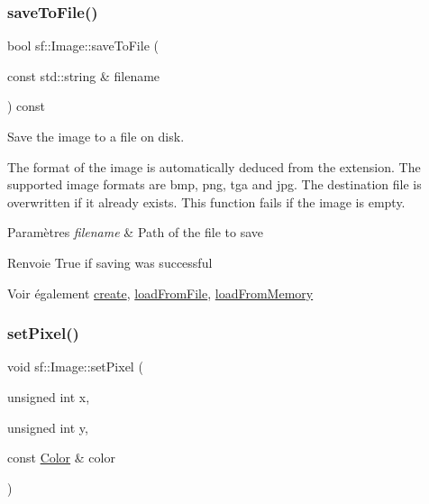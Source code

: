 \subsubsection{\texorpdfstring{save\+To\+File()}{saveToFile()}}
{\footnotesize\ttfamily bool sf\+::\+Image\+::save\+To\+File (\begin{DoxyParamCaption}\item[{const std\+::string \&}]{filename }\end{DoxyParamCaption}) const}



Save the image to a file on disk. 

The format of the image is automatically deduced from the extension. The supported image formats are bmp, png, tga and jpg. The destination file is overwritten if it already exists. This function fails if the image is empty.


\begin{DoxyParams}{Paramètres}
{\em filename} & Path of the file to save\\
\hline
\end{DoxyParams}
\begin{DoxyReturn}{Renvoie}
True if saving was successful
\end{DoxyReturn}
\begin{DoxySeeAlso}{Voir également}
\hyperlink{classsf_1_1Image_a2a67930e2fd9ad97cf004e918cf5832b}{create}, \hyperlink{classsf_1_1Image_a9e4f2aa8e36d0cabde5ed5a4ef80290b}{load\+From\+File}, \hyperlink{classsf_1_1Image_aaa6c7afa5851a51cec6ab438faa7354c}{load\+From\+Memory} 
\end{DoxySeeAlso}
\mbox{\label{classsf_1_1Image_a9fd329b8cd7d4439e07fb5d3bb2d9744}} 
\subsubsection{\texorpdfstring{set\+Pixel()}{setPixel()}}
{\footnotesize\ttfamily void sf\+::\+Image\+::set\+Pixel (\begin{DoxyParamCaption}\item[{unsigned int}]{x,  }\item[{unsigned int}]{y,  }\item[{const \hyperlink{classsf_1_1Color}{Color} \&}]{color }\end{DoxyParamCaption})}



